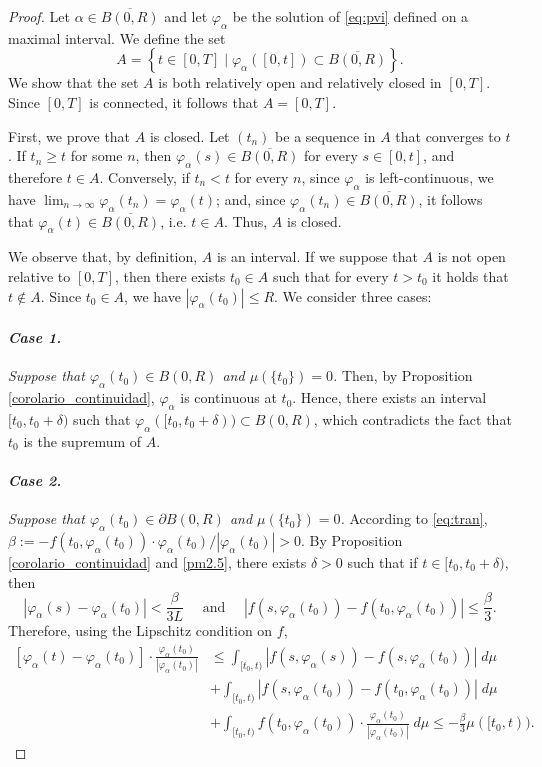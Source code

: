 \documentclass[a4paper,11pt]{amsart}
\theoremstyle{plain}
\theoremstyle{remark}
\numberwithin{equation}{section}
\begin{document}
 \begin{proof} Let $\alpha\in  \overline{B(0,R)}$ and let $\varphi_\alpha$ be the solution of \eqref{eq:pvi} defined on a maximal interval. We define the set
\[A=\left\{t\in [0,T] \mid \varphi_\alpha([0,t])\subset \overline{B(0,R)}\right\}.\]
We show that the set $A$ is both relatively open and relatively closed in $[0,T]$. Since $[0,T]$ is connected, it follows that $A=[0,T]$.
  
First, we prove that $A$ is closed.    
Let $(t_n)$ be a sequence in $A$ that converges to $t$. If $t_n\geq t$ for some $n$, then $\varphi_\alpha(s)\in\overline{B(0,R)}$ for every $s\in [0,t]$, and therefore $t\in A$. Conversely, if $t_n < t$ for every $n$, since $\varphi_\alpha$ is left-continuous, we have $\lim_{n\to \infty}\varphi_\alpha(t_n)=\varphi_\alpha(t)$; and, since $\varphi_\alpha(t_n)\in \overline{B(0,R)}$, it follows that $\varphi_\alpha(t)\in \overline{B(0,R)}$, i.e. $t\in A$. Thus, $A$ is closed.

We observe that, by definition, $A$ is an interval.  	 
If we suppose that $A$ is not open relative to $[0,T]$, then there exists $ t_0\in A$ such that for every $t> t_0$ it holds that $t\notin A$. Since $t_0\in A$, we have $|\varphi_\alpha(t_0)|\leq R$. We consider three cases:

 \paragraph{\emph{Case 1.}} \emph{Suppose that $\varphi_\alpha(t_0)\in B(0,R)$ and $\mu(\{t_0\})=0$.} Then, by Proposition \ref{corolario_continuidad}, $\varphi_\alpha$ is continuous at $t_0$. Hence, there exists an interval $[t_0,t_0+\delta)$ such that $\varphi_\alpha([t_0,t_0+\delta))\subset B(0,R)$, which contradicts the fact that $t_0$ is the supremum of $A$.

 \paragraph{\emph{Case 2.}} \emph{Suppose that $\varphi_\alpha(t_0)\in \partial B(0,R)$ and $\mu(\{t_0\})= 0$.}  According to \ref{eq:tran}, $\beta:=-f(t_0,\varphi_\alpha(t_0))\cdot\varphi_\alpha(t_0)/|\varphi_\alpha(t_0)|>0$. By Proposition \ref{corolario_continuidad} and \ref{pm2.5}, there exists $\delta>0$ such that if $t\in[t_0,t_0+\delta)$, then 
 $$ |\varphi_\alpha(s)-\varphi_\alpha(t_0)|<\frac{\beta}{3L}\quad \text{ and }\quad |f(s,\varphi_\alpha(t_0))-f(t_0,\varphi_\alpha(t_0))|\leq \frac{\beta}{3}. $$ 
   Therefore, using the Lipschitz condition on $f$,
\[\begin{split}
      \left[ \varphi_\alpha(t)-\varphi_\alpha(t_0) \right] \cdot \frac{\varphi_\alpha(t_0)}{|\varphi_\alpha(t_0)|} &\leq \int_{[t_0,t)}\left|f(s,\varphi_\alpha(s))-f(s,\varphi_\alpha(t_0))\right|\; d\mu\\  &+ \int_{[t_0,t)}\left|f(s,\varphi_\alpha(t_0))-f(t_0,\varphi_\alpha(t_0))\right| \; d\mu \\ &+ \int_{[t_0,t)}f(t_0,\varphi_\alpha(t_0))\cdot \frac{\varphi_\alpha(t_0)}{|\varphi_\alpha(t_0)|}\; d\mu
\leq -\frac{\beta}{3}\mu([t_0,t)).
\end{split}
\]
 

\end{proof}
\end{document}
